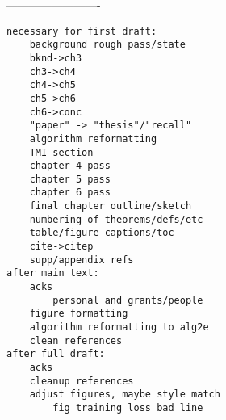 -------------------------

\begin{verbatim}
necessary for first draft:
	background rough pass/state
	bknd->ch3
	ch3->ch4
	ch4->ch5
	ch5->ch6
	ch6->conc
	"paper" -> "thesis"/"recall"
	algorithm reformatting
	TMI section
	chapter 4 pass
	chapter 5 pass
	chapter 6 pass
	final chapter outline/sketch
    numbering of theorems/defs/etc
	table/figure captions/toc
	cite->citep
	supp/appendix refs
after main text:
    acks
    	personal and grants/people
    figure formatting
    algorithm reformatting to alg2e
    clean references
after full draft:
	acks
	cleanup references
	adjust figures, maybe style match
		fig training loss bad line
\end{verbatim}

